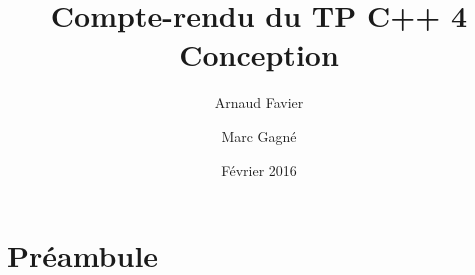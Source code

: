 \documentclass[11pt,a4paper]{article}
\begin{document}
	
	\title{
		Compte-rendu du TP C++ 4\\
		Conception
	}
	\author{
		Arnaud Favier\\
		\and
		Marc Gagné
	}
	\date{Février 2016}
	\maketitle
	
	\section*{Préambule}

	
\end{document}
